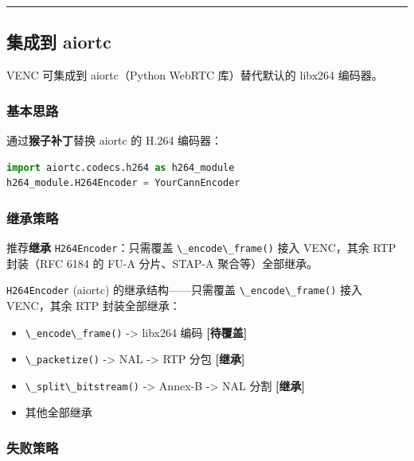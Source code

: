 \begin{center}\rule{0.5\linewidth}{0.5pt}\end{center}

\subsection{集成到 aiortc}\label{src-book-chapter6-h38}

VENC 可集成到 aiortc（Python WebRTC 库）替代默认的 libx264 编码器。

\subsubsection{基本思路}\label{src-book-chapter6-h39}

通过\textbf{猴子补丁}替换 aiortc 的 H.264 编码器：

\begin{lstlisting}[language=Python]
import aiortc.codecs.h264 as h264_module
h264_module.H264Encoder = YourCannEncoder
\end{lstlisting}

\subsubsection{继承策略}\label{src-book-chapter6-h40}

推荐\textbf{继承} \passthrough{\lstinline!H264Encoder!}：只需覆盖
\passthrough{\lstinline!\_encode\_frame()!} 接入 VENC，其余 RTP
封装（RFC 6184 的 FU-A 分片、STAP-A 聚合等）全部继承。

\passthrough{\lstinline!H264Encoder!} (aiortc) 的继承结构------只需覆盖
\passthrough{\lstinline!\_encode\_frame()!} 接入 VENC，其余 RTP
封装全部继承：

\begin{itemize}
\tightlist
\item
  \passthrough{\lstinline!\_encode\_frame()!} -\textgreater{} libx264
  编码 \textbf{{[}待覆盖{]}}
\item
  \passthrough{\lstinline!\_packetize()!} -\textgreater{} NAL
  -\textgreater{} RTP 分包 \textbf{{[}继承{]}}
\item
  \passthrough{\lstinline!\_split\_bitstream()!} -\textgreater{} Annex-B
  -\textgreater{} NAL 分割 \textbf{{[}继承{]}}
\item
  其他全部继承
\end{itemize}

\subsubsection{失败策略}\label{src-book-chapter6-h41}

